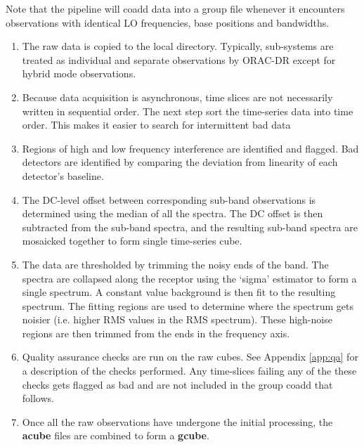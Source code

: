 \documentclass[twoside,11pt]{article}
\renewcommand{\_}{\texttt{\symbol{95}}}
\begin{document}
Note that the pipeline will coadd data into a group file whenever it encounters observations with identical LO frequencies, base positions and bandwidths.

\begin{enumerate}[label=(\textbf{\arabic*})]

\item  The raw data is copied to the local directory. Typically, sub-systems are treated as individual and separate observations by ORAC-DR except for hybrid mode observations.

\item Because data acquisition is asynchronous, time slices are not necessarily written in sequential order. The next step sort the time-series data into time order. This makes it easier to search for intermittent bad data

\item  Regions of high and low frequency interference are identified and flagged. Bad detectors are identified by comparing the deviation from linearity of each detector's baseline.

\item   The DC-level offset between corresponding sub-band observations is determined using the median of all the spectra.  The DC offset is then subtracted from the sub-band spectra, and the resulting sub-band spectra are mosaicked together to form single time-series cube.

\item   The data are thresholded by trimming the noisy ends of the band. The spectra are collapsed along the receptor using the `sigma' estimator to form a single spectrum. A constant value background is then fit to the resulting spectrum. The fitting regions are used to determine where the spectrum gets noisier (i.e. higher RMS values in the RMS spectrum). These high-noise regions are then trimmed from the ends in the frequency axis.

\item  Quality assurance checks are run on the raw cubes. See Appendix \ref{app:qa} for a description of the checks performed. Any time-slices failing any of the these checks gets flagged as bad and are not included in the group coadd that follows.

\item  Once all the raw observations have undergone the initial processing, the \textbf{a\_cube} files are combined to form a \textbf{g\_cube}.


\end{enumerate}
\end{document}
